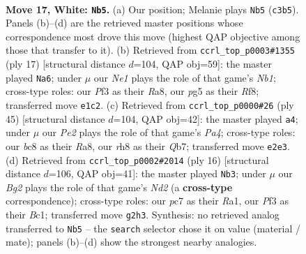 \documentclass[11pt]{article}
\begin{document}
\begin{figure}[p]
\label{fig:thought-m30}
\end{figure}

\clearpage

\begin{figure}[p]\centering
\begin{subfigure}{0.46\textwidth}\centering
\resizebox{\linewidth}{!}{%
\newchessgame
\chessboard[
  setfen={r1b1kb1r/1pp5/1nn5/6pp/5p1q/p1NP1P2/PP1BP1B1/R1Q1NRK1 w kq - 0 17},
  showmover=false,
  pgfstyle=straightmove, color=movearrow, markmove={c3-b5}
]}
\caption{}
\end{subfigure}\hfill
\begin{subfigure}{0.46\textwidth}\centering
\resizebox{\linewidth}{!}{%
\newchessgame
\chessboard[
  setfen={rn1q1rk1/pp1b1ppp/4pn2/2bp4/2P5/4PNB1/PPQ1BPPP/RN2K2R b KQ - 3 9},
  showmover=false,
  pgfstyle=straightmove, color=movearrow, markmove={b8-a6}
]}
\caption{}
\end{subfigure}
\\[4pt]
\begin{subfigure}{0.46\textwidth}\centering
\resizebox{\linewidth}{!}{%
\newchessgame
\chessboard[
  setfen={r3r1k1/1q2npb1/2b1p1pp/p2pP3/1n1P1P1B/2N4P/1P1N2P1/2RQRB1K b - - 0 23},
  showmover=false,
  pgfstyle=straightmove, color=movearrow, markmove={a5-a4}
]}
\caption{}
\end{subfigure}\hfill
\begin{subfigure}{0.46\textwidth}\centering
\resizebox{\linewidth}{!}{%
\newchessgame
\chessboard[
  setfen={r1bqk2r/1p3ppp/p1n1p1n1/2bpP3/8/3B1N2/PPPN1PPP/R1BQ1RK1 w kq - 1 9},
  showmover=false,
  pgfstyle=straightmove, color=movearrow, markmove={d2-b3}
]}
\caption{}
\end{subfigure}
\caption{\textbf{Move 17, White: \texttt{Nb5}.} (a) Our position; Melanie plays \texttt{Nb5} (\texttt{c3b5}). Panels (b)--(d) are the retrieved master positions whose correspondence most drove this move (highest QAP objective among those that transfer to it). (b) Retrieved from \texttt{ccrl\_top\_p0003\#1355} (ply 17) [structural distance $d$=104, QAP obj=59]: the master played \texttt{Na6}; under $\mu$ our \emph{Ne1} plays the role of that game's \emph{Nb1}; cross-type roles: our \emph{P}f3 as their \emph{R}a8, our \emph{p}g5 as their \emph{R}f8; transferred move \texttt{e1c2}. (c) Retrieved from \texttt{ccrl\_top\_p0000\#26} (ply 45) [structural distance $d$=104, QAP obj=42]: the master played \texttt{a4}; under $\mu$ our \emph{Pe2} plays the role of that game's \emph{Pa4}; cross-type roles: our \emph{b}c8 as their \emph{R}a8, our \emph{r}h8 as their \emph{Q}b7; transferred move \texttt{e2e3}. (d) Retrieved from \texttt{ccrl\_top\_p0002\#2014} (ply 16) [structural distance $d$=106, QAP obj=41]: the master played \texttt{Nb3}; under $\mu$ our \emph{Bg2} plays the role of that game's \emph{Nd2} (a \textbf{cross-type} correspondence); cross-type roles: our \emph{p}c7 as their \emph{R}a1, our \emph{P}f3 as their \emph{B}c1; transferred move \texttt{g2h3}. Synthesis: no retrieved analog transferred to \texttt{Nb5} -- the \texttt{search} selector chose it on value (material / mate); panels (b)--(d) show the strongest nearby analogies.}
\label{fig:thought-m32}
\end{figure}
\end{document}
